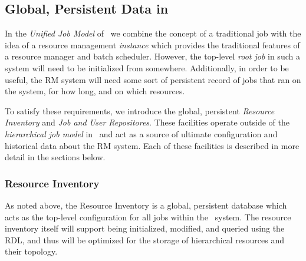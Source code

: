\subsection{Global, Persistent Data in \ngrm}

In the \emph{Unified Job Model} of \ngrm\ we combine the concept
of a traditional job with the idea of a resource management
\emph{instance} which provides the traditional features of a
resource manager and batch scheduler. However, the top-level
\emph{root job} in such a system will need to be initialized from
somewhere. Additionally, in order to be useful, the RM system will
need some sort of persistent record of jobs that ran on the system,
for how long, and on which resources.

To satisfy these requirements, we introduce the global, persistent
\emph{Resource Inventory} and \emph{Job and User Repositores}. These
facilities operate outside of the \emph{hierarchical job model} in
\ngrm\ and act as a source of ultimate configuration and historical
data about the RM system. Each of these facilities is described
in more detail in the sections below.

\subsubsection{Resource Inventory}

\ifcomments
{}

As noted above, the Resource Inventory is a global, persistent
database which acts as the top-level configuration for all
jobs within the \ngrm\ system. The resource inventory itself
will support being initialized, modified, and queried using
the RDL, and thus will be optimized for the storage of hierarchical
resources and their topology.
\ifcomments
{}
\fi

